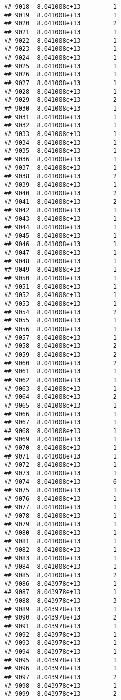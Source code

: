 \documentclass[
]{article}
\begin{document}
\begin{verbatim}
## 9018  8.041008e+13         1
## 9019  8.041008e+13         1
## 9020  8.041008e+13         2
## 9021  8.041008e+13         1
## 9022  8.041008e+13         1
## 9023  8.041008e+13         1
## 9024  8.041008e+13         1
## 9025  8.041008e+13         1
## 9026  8.041008e+13         1
## 9027  8.041008e+13         1
## 9028  8.041008e+13         1
## 9029  8.041008e+13         2
## 9030  8.041008e+13         1
## 9031  8.041008e+13         1
## 9032  8.041008e+13         1
## 9033  8.041008e+13         1
## 9034  8.041008e+13         1
## 9035  8.041008e+13         1
## 9036  8.041008e+13         1
## 9037  8.041008e+13         1
## 9038  8.041008e+13         2
## 9039  8.041008e+13         1
## 9040  8.041008e+13         2
## 9041  8.041008e+13         2
## 9042  8.041008e+13         1
## 9043  8.041008e+13         1
## 9044  8.041008e+13         1
## 9045  8.041008e+13         1
## 9046  8.041008e+13         1
## 9047  8.041008e+13         1
## 9048  8.041008e+13         1
## 9049  8.041008e+13         1
## 9050  8.041008e+13         1
## 9051  8.041008e+13         1
## 9052  8.041008e+13         1
## 9053  8.041008e+13         1
## 9054  8.041008e+13         2
## 9055  8.041008e+13         1
## 9056  8.041008e+13         1
## 9057  8.041008e+13         1
## 9058  8.041008e+13         2
## 9059  8.041008e+13         2
## 9060  8.041008e+13         2
## 9061  8.041008e+13         1
## 9062  8.041008e+13         1
## 9063  8.041008e+13         1
## 9064  8.041008e+13         2
## 9065  8.041008e+13         1
## 9066  8.041008e+13         1
## 9067  8.041008e+13         1
## 9068  8.041008e+13         1
## 9069  8.041008e+13         1
## 9070  8.041008e+13         1
## 9071  8.041008e+13         1
## 9072  8.041008e+13         1
## 9073  8.041008e+13         1
## 9074  8.041008e+13         6
## 9075  8.041008e+13         1
## 9076  8.041008e+13         1
## 9077  8.041008e+13         1
## 9078  8.041008e+13         1
## 9079  8.041008e+13         1
## 9080  8.041008e+13         1
## 9081  8.041008e+13         1
## 9082  8.041008e+13         1
## 9083  8.041008e+13         1
## 9084  8.041008e+13         1
## 9085  8.041008e+13         2
## 9086  8.043978e+13         1
## 9087  8.043978e+13         1
## 9088  8.043978e+13         3
## 9089  8.043978e+13         1
## 9090  8.043978e+13         2
## 9091  8.043978e+13         1
## 9092  8.043978e+13         1
## 9093  8.043978e+13         1
## 9094  8.043978e+13         1
## 9095  8.043978e+13         1
## 9096  8.043978e+13         1
## 9097  8.043978e+13         2
## 9098  8.043978e+13         1
## 9099  8.043978e+13         2

\end{verbatim}
\end{document}
